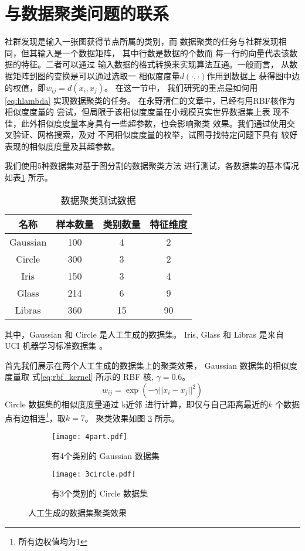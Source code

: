\section{与数据聚类问题的联系}
社群发现是输入一张图获得节点所属的类别，而
数据聚类的任务与社群发现相同，但其输入是一个数据矩阵，
其中行数是数据的个数而
每一行的向量代表该数据的特征。二者可以通过
输入数据的格式转换来实现算法互通。一般而言，
从数据矩阵到图的变换是可以通过选取一
相似度度量$d(\cdot,\cdot)$作用到数据上
获得图中边的权值，即$w_{ij}=d(x_i, x_j)$。
在这一节中，
我们研究的重点是如何用
\eqref{eq:hlambda} 实现数据聚类的任务。
在永野清仁的文章中\cite{mac}，已经有用RBF核作为相似度度量的
尝试，但局限于该相似度度量在小规模真实世界数据集上表
现不佳，此外相似度度量本身具有一些超参数，也会影响聚类
效果。我们通过使用交叉验证、网格搜索，及对
不同相似度度量的枚举，试图寻找特定问题下具有
较好表现的相似度度量及其超参数。

我们使用5种数据集对基于图分割的数据聚类方法
进行测试，各数据集的基本情况如表\ref{tab:clustering_dataset}
所示。
\begin{table}[!ht]
  \centering
  \begin{tabular}{|c|c|c|c|}
    \toprule
    名称 & 样本数量 & 类别数量 & 特征维度 \\
    \midrule
    Gaussian & 100 & 4 & 2 \\
    Circle & 300 & 3 & 2 \\
    Iris & 150 & 3 & 4 \\
    Glass & 214 & 6 & 9 \\
    Libras & 360 & 15 & 90 \\
    \bottomrule
  \end{tabular}
  \caption{数据聚类测试数据}\label{tab:clustering_dataset}
\end{table}
其中，Gaussian 和 Circle 是人工生成的数据集。
Iris, Glass 和 Libras 是来自 UCI 机器学习标准数据集
\cite{Dua:2019}。

首先我们展示在两个人工生成的数据集上的聚类效果，
Gaussian 数据集的相似度度量取 式\ref{eq:rbf_kernel} 所示的 RBF 核,
$\gamma=0.6$。
\begin{equation}\label{eq:rbf_kernel}
  w_{ij}=\exp(-\gamma ||x_i-x_j||^2)
\end{equation}
Circle 数据集的相似度度量通过 k近邻 进行计算，即仅与自己距离最近的$k$
个数据点有边相连\footnote{所有边权值均为1}，取$k=7$。
聚类效果如图 \ref{fig:artificial_dataset_effect} 所示。

\begin{figure}[!ht]
  \begin{subfigure}[b]{\linewidth}
  \texttt{[image: 4part.pdf]}
  \caption{有4个类别的 Gaussian 数据集}
  \label{fig:4p}
\end{subfigure}
\begin{subfigure}[b]{\linewidth}
  \texttt{[image: 3circle.pdf]}
  \caption{有3个类别的 Circle 数据集}
  \label{fig:3c}
\end{subfigure}
\caption{人工生成的数据集聚类效果}
\label{fig:artificial_dataset_effect}
\end{figure}

